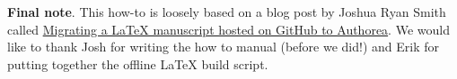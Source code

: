 \textbf{Final note}. This how-to is loosely based on a blog post by Joshua Ryan Smith called \href{http://jrsmith3.github.io/migrating-a-latex-manuscript-hosted-on-github-to-authorea.html}{Migrating a LaTeX manuscript hosted on GitHub to Authorea}. We would like to thank Josh for writing the how to manual (before we did!) and Erik for putting together the offline LaTeX build script.
